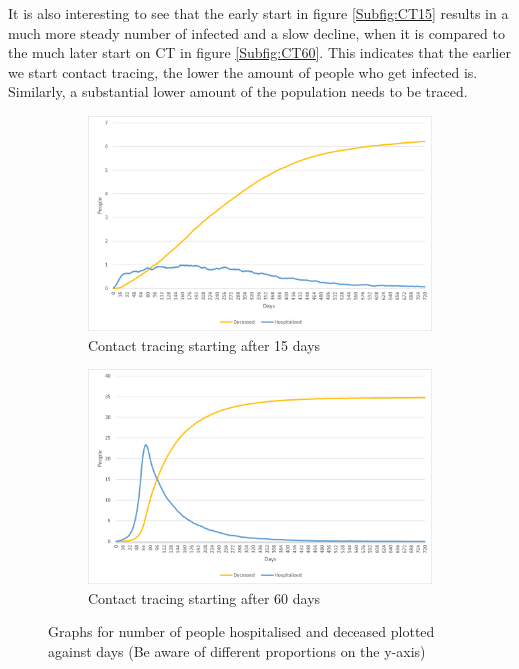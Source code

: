 It is also interesting to see that the early start in figure \ref{Subfig:CT15} results in a much more steady number of infected and a slow decline, when it is compared to the much later start on CT in figure \ref{Subfig:CT60}. This indicates that the earlier we start contact tracing, the lower the amount of people who get infected is. Similarly, a substantial lower amount of the population needs to be traced.

\begin{figure}[H]
\centering
\begin{subfigure}{.5\textwidth}
  \centering
  \includegraphics[width=.95\linewidth]{0_billeder/CT15DaysDH.png}
  \caption{Contact tracing starting after 15 days}
  \label{Subfig:CT15DH}
\end{subfigure}%
\begin{subfigure}{.5\textwidth}
  \centering
  \includegraphics[width=.95\linewidth]{0_billeder/CT60DaysDH.png}
  \caption{Contact tracing starting after 60 days}
  \label{Subfig:CT60DH}
\end{subfigure}
\caption{Graphs for number of people hospitalised and deceased plotted against days (Be aware of different proportions on the y-axis)}
\label{fig:CTstart2}
\end{figure}


